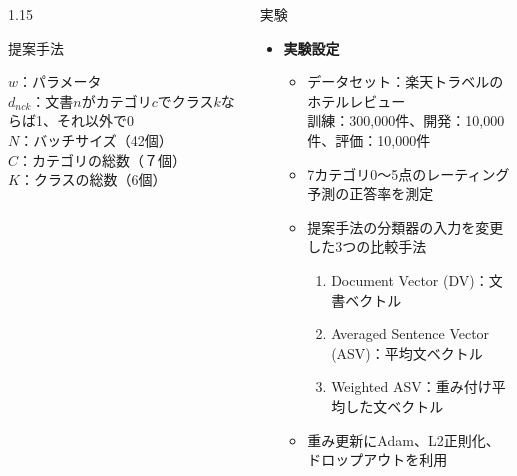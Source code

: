 \documentclass[unicode,10pt]{beamer}
\newlength{\mycolumnwidth}
\newcommand{\itemtitle}[1]{\textbf{#1}\\}
\begin{document}
\begin{frame}[t]
\begin{columns}[onlytextwidth,t]
\begin{column}{1.15\mycolumnwidth}
\begin{block}{提案手法}
\begin{itemize}
{          $w$：パラメータ \\
          $d_{nck}$：文書$n$がカテゴリ$c$でクラス$k$ならば1、それ以外で0 \\
          $N$：バッチサイズ（42個）\\
          $C$：カテゴリの総数（７個）\\
          $K$：クラスの総数（6個）\\
        }
    \end{itemize}
  \end{block}
\end{column}

\begin{column}{\mycolumnwidth}
  \begin{block}{実験}
    \begin{itemize}
      \item \itemtitle{実験設定}
        \begin{itemize}
          \item データセット：楽天トラベルのホテルレビュー\\
                訓練：300,000件、開発：10,000件、評価：10,000件
          \item 7カテゴリ0〜5点のレーティング予測の正答率を測定
          \item 提案手法の分類器の入力を変更した3つの比較手法
            \begin{enumerate}
              \item Document Vector (DV)：文書ベクトル
              \item Averaged Sentence Vector (ASV)：平均文ベクトル
              \item Weighted ASV：重み付け平均した文ベクトル
            \end{enumerate}
          \item 重み更新にAdam、L2正則化、ドロップアウトを利用
        \end{itemize}
    \end{itemize}


\end{block}
\end{column}
\end{columns}
\end{frame}
\end{document}
